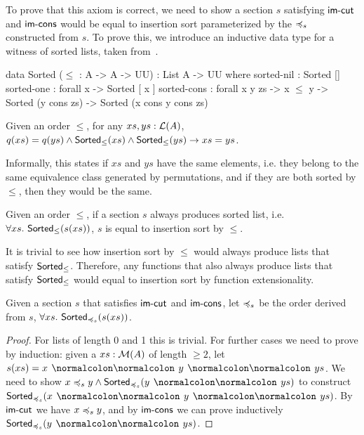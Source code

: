 To prove that this axiom is correct, we need to show a section $s$ satisfying
$\operatorname{\mathsf{im-cut}}$ and $\operatorname{\mathsf{im-cons}}$ would be equal to insertion sort parameterized by
the $\preccurlyeq_{s}$ constructed from $s$. To prove this, we introduce an inductive data type
for a witness of sorted lists, taken from~\cite{appelVerifiedFunctionalAlgorithms2023}.

\begin{code}
data Sorted ($\leq$ : A -> A -> UU) : List A -> UU where
  sorted-nil : Sorted []
  sorted-one : forall x -> Sorted [ x ]
  sorted-cons : forall x y zs -> x $\leq$ y
     -> Sorted (y cons zs) -> Sorted (x cons y cons zs)
\end{code}

\begin{proposition}
    Given an order $\leq$, for any $xs, ys : \mathcal{L}(A)$,
    $q(xs) = q(ys) \land \operatorname{\mathsf{Sorted}}_{\leq}(xs) \land \operatorname{\mathsf{Sorted}}_{\leq}(ys) \to xs = ys$.
\end{proposition}

Informally, this states if $xs$ and $ys$ have the same elements, i.e. they belong to the same
equivalence class generated by permutations, and if they are both sorted by $\leq$, then they would be the same.

\begin{corollary}\label{sort:sort-uniq}
    Given an order $\leq$,
    if a section $s$ always produces sorted list, i.e. $\forall xs.\,\operatorname{\mathsf{Sorted}}_{\leq}(s(xs))$,
    $s$ is equal to insertion sort by $\leq$.
\end{corollary}
It is trivial to see how insertion sort by $\leq$ would always produce lists that satisfy
$\operatorname{\mathsf{Sorted}}_{\leq}$. Therefore, any functions that also always produce lists that satisfy
$\operatorname{\mathsf{Sorted}}_{\leq}$ would equal to insertion sort by function extensionality.

\begin{corollary}\label{sort:well-behave-sorts}
    Given a section $s$ that satisfies $\operatorname{\mathsf{im-cut}}$ and $\operatorname{\mathsf{im-cons}}$,
    let $\preccurlyeq_{s}$ be the order derived from $s$,
    $\forall xs.\,\operatorname{\mathsf{Sorted}}_{\preccurlyeq_{s}}(s(xs))$.
\end{corollary}
\begin{proof}
    For lists of length 0 and 1 this is trivial. For further cases we need to prove by induction:
    given a $xs : \mathcal{M}(A)$ of length $\geq 2$, let $s(xs) = x \cons y \cons ys$. We need to show
    $x \leqs y \land \term{Sorted}_{\leqs}(y \cons ys)$ to construct
    $\term{Sorted}_{\leqs}(x \cons y \cons ys)$.
    By $\operatorname{\mathsf{im-cut}}$ we have $x \preccurlyeq_{s} y$, and by $\operatorname{\mathsf{im-cons}}$ we can prove
    inductively $\term{Sorted}_{\leqs}(y \cons ys)$.
\end{proof}

